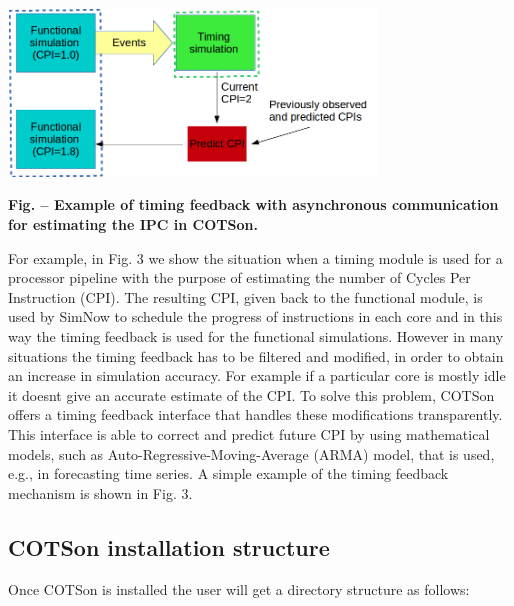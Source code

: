 \documentclass[a4paper]{article}
\newcounter{Figure}
\renewcommand\theFigure{\arabic{Figure}}
\begin{document}
{\centering 
\includegraphics[width=3.8583in,height=1.7591in]{img3.png}
\par}

{\centering{}\sffamily\bfseries
\label{bkm:Ref388169507}Fig.
\stepcounter{Figure}{\theFigure} -- Example of timing feedback with
asynchronous communication for estimating the IPC in COTSon.
\par}

{
For example, in Fig. 3 we show the situation when a timing module is
used for a processor pipeline with the purpose of estimating the number
of Cycles Per Instruction (CPI). The resulting CPI, given back to the
functional module, is used by SimNow to schedule the progress of
instructions in each core and in this way the timing feedback is used
for the functional simulations. However in many situations the timing
feedback has to be filtered and modified, in order to obtain an
increase in simulation accuracy. For example if a particular core is
mostly idle it doesn{\textquotesingle}t give an accurate estimate of
the CPI. To solve this problem, COTSon offers a timing feedback
interface that handles these modifications transparently. This
interface is able to correct and predict future CPI by using
mathematical models, such as Auto-Regressive-Moving-Average (ARMA)
model, that is used, e.g., in forecasting time series. A simple example
of the timing feedback mechanism is shown in Fig. 3.}

\subsection[COTSon installation structure]{COTSon
\foreignlanguage{english}{installation} structure}
{
Once COTSon is installed the user will get a directory structure as
follows:}
\end{document}

